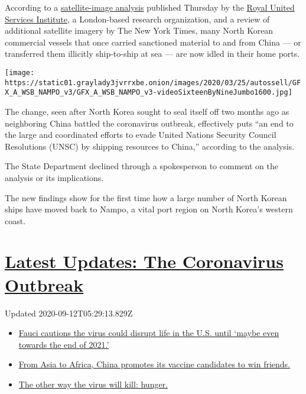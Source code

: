 According to a
\href{https://rusi.org/commentary/rickety-anchor-north-korea-calls-its-illicit-shipping-fleet-home-amid-coronavirus-fears}{satellite-image
analysis} published Thursday by the
\href{https://rusi.org/project/project-sandstone}{Royal United Services
Institute}, a London-based research organization, and a review of
additional satellite imagery by The New York Times, many North Korean
commercial vessels that once carried sanctioned material to and from
China --- or transferred them illicitly ship-to-ship at sea --- are now
idled in their home ports.

\texttt{[image: https://static01.graylady3jvrrxbe.onion/images/2020/03/25/autossell/GFX\_A\_WSB\_NAMPO\_v3/GFX\_A\_WSB\_NAMPO\_v3-videoSixteenByNineJumbo1600.jpg]}

The change, seen after North Korea sought to seal itself off two months
ago as neighboring China battled the coronavirus outbreak, effectively
puts ``an end to the large and coordinated efforts to evade United
Nations Security Council Resolutions (UNSC) by shipping resources to
China,'' according to the analysis.

The State Department declined through a spokesperson to comment on the
analysis or its implications.

The new findings show for the first time how a large number of North
Korean ships have moved back to Nampo, a vital port region on North
Korea's western coast.

\hypertarget{latest-updates-the-coronavirus-outbreak}{%
\section{\texorpdfstring{\href{https://www.nytimes3xbfgragh.onion/2020/09/11/world/covid-19-coronavirus.html?action=click\&pgtype=Article\&state=default\&region=MAIN_CONTENT_1\&context=storylines_live_updates}{Latest
Updates: The Coronavirus
Outbreak}}{Latest Updates: The Coronavirus Outbreak}}\label{latest-updates-the-coronavirus-outbreak}}

Updated 2020-09-12T05:29:13.829Z

\begin{itemize}
\tightlist
\item
  \href{https://www.nytimes3xbfgragh.onion/2020/09/11/world/covid-19-coronavirus.html?action=click\&pgtype=Article\&state=default\&region=MAIN_CONTENT_1\&context=storylines_live_updates\#link-dfb8a16}{Fauci
  cautions the virus could disrupt life in the U.S. until `maybe even
  towards the end of 2021.'}
\item
  \href{https://www.nytimes3xbfgragh.onion/2020/09/11/world/covid-19-coronavirus.html?action=click\&pgtype=Article\&state=default\&region=MAIN_CONTENT_1\&context=storylines_live_updates\#link-7104d154}{From
  Asia to Africa, China promotes its vaccine candidates to win friends.}
\item
  \href{https://www.nytimes3xbfgragh.onion/2020/09/11/world/covid-19-coronavirus.html?action=click\&pgtype=Article\&state=default\&region=MAIN_CONTENT_1\&context=storylines_live_updates\#link-393ad215}{The
  other way the virus will kill: hunger.}
\end{itemize}

